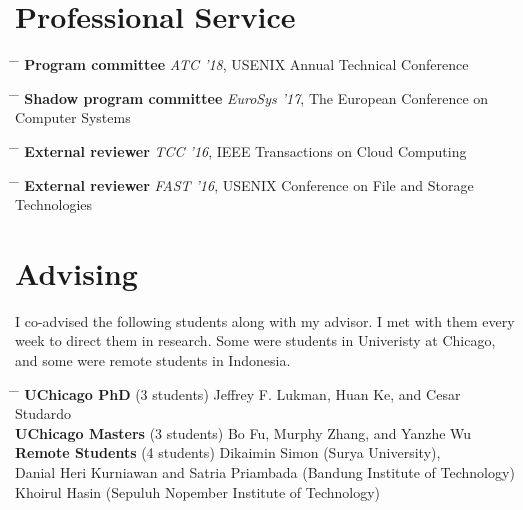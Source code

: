 \documentclass[10pt]{article} %
\begin{document}
\section{Professional Service}

\begin{tabbing}
\hspace{1.5cm} \= \hspace{4.5cm}  \=  \> \textbf{Program committee} \> \textit{ATC '18}, USENIX Annual Technical Conference
\end{tabbing}

\begin{tabbing}
\hspace{1.5cm} \= \hspace{4.5cm}  \=  \> \textbf{Shadow program committee} \> \textit{EuroSys '17}, The European Conference on Computer Systems
\end{tabbing}

\begin{tabbing}
\hspace{1.5cm} \= \hspace{4.5cm}  \=  \> \textbf{External reviewer} \> \textit{TCC '16}, IEEE Transactions on Cloud Computing 
\end{tabbing}

\begin{tabbing}
\hspace{1.5cm} \= \hspace{4.5cm}  \=  \> \textbf{External reviewer} \> \textit{FAST '16}, USENIX Conference on File and Storage Technologies
\end{tabbing}


\section{Advising}

I co-advised the following students along with my advisor. I met with them
every week to direct them in research. Some were students in Univeristy at
Chicago, and some were remote students in Indonesia.
\begin{tabbing}
\hspace{3.5cm} \= \hspace{2.5cm} \= \kill
\textbf{UChicago PhD} \> (3 students) \> Jeffrey F. Lukman, Huan Ke, and Cesar Studardo\\
\textbf{UChicago Masters} \> (3 students) \> Bo Fu, Murphy Zhang, and Yanzhe Wu\\
\textbf{Remote Students} \> (4 students) \> Dikaimin Simon (Surya University),\\
\> \>Danial Heri Kurniawan and Satria Priambada (Bandung Institute of Technology)\\
\> \>Khoirul Hasin (Sepuluh Nopember Institute of Technology)
\end{tabbing}
\end{document}
